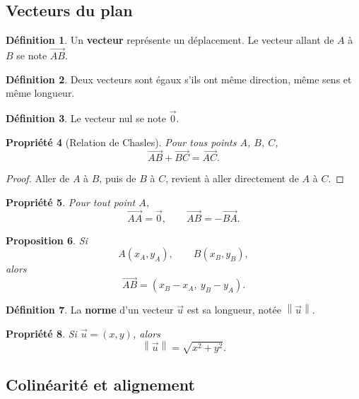 \documentclass[11pt,a4paper]{article}
\newcommand{\norme}[1]{\left\|#1\right\|}
\newcommand{\uu}{\overrightarrow{u}}
\theoremstyle{definition}
\newtheorem{definition}{Définition}[section]
\theoremstyle{plain}
\newtheorem{propriete}[definition]{Propriété}
\newtheorem{proposition}[definition]{Proposition}
\begin{document}
\subsection{Vecteurs du plan}

\begin{definition}
Un \textbf{vecteur} représente un déplacement.
Le vecteur allant de $A$ à $B$ se note $\overrightarrow{AB}$.
\end{definition}

\begin{definition}
Deux vecteurs sont égaux s'ils ont même direction, même sens et même longueur.
\end{definition}

\begin{definition}
Le vecteur nul se note $\overrightarrow{0}$.
\end{definition}

\begin{propriete}[Relation de Chasles]
Pour tous points $A$, $B$, $C$,
\[
\overrightarrow{AB}+\overrightarrow{BC}=\overrightarrow{AC}.
\]
\end{propriete}

\begin{proof}
Aller de $A$ à $B$, puis de $B$ à $C$, revient à aller directement de $A$ à $C$.
\end{proof}

\begin{propriete}
Pour tout point $A$,
\[
\overrightarrow{AA}=\overrightarrow{0},
\qquad
\overrightarrow{AB}=-\overrightarrow{BA}.
\]
\end{propriete}

\begin{proposition}
Si
\[
A(x_A,y_A),\qquad B(x_B,y_B),
\]
alors
\[
\overrightarrow{AB}=(x_B-x_A,\ y_B-y_A).
\]
\end{proposition}

\begin{definition}
La \textbf{norme} d'un vecteur $\uu$ est sa longueur, notée $\norme{\uu}$.
\end{definition}

\begin{propriete}
Si $\uu=(x,y)$, alors
\[
\norme{\uu}=\sqrt{x^2+y^2}.
\]
\end{propriete}

\subsection{Colinéarité et alignement}
\end{document}
